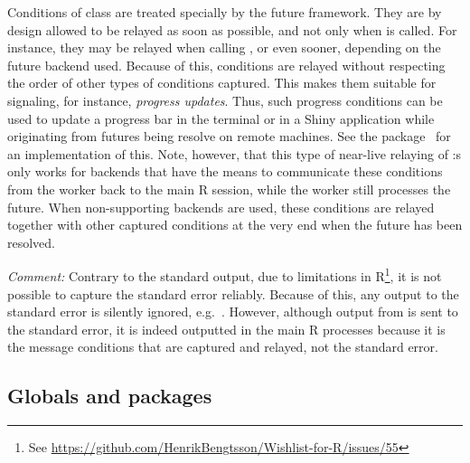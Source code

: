 Conditions of class  are treated specially by
the future framework. They are by design allowed to be relayed as soon
as possible, and not only when  is called. For instance,
they may be relayed when calling , or even sooner,
depending on the future backend used. Because of this,
 conditions are relayed without respecting
the order of other types of conditions captured. This makes them
suitable for signaling, for instance, \emph{progress updates}.  Thus,
such progress conditions can be used to update a progress bar in the
terminal or in a Shiny application while originating from futures
being resolve on remote machines.  See the 
package~\citep{CRAN:progressr} for an implementation of this.  Note,
however, that this type of near-live relaying of
:s only works for backends that have the means to
communicate these conditions from the worker back to the main R
session, while the worker still processes the future.  When
non-supporting backends are used, these conditions are relayed
together with other captured conditions at the very end when the
future has been resolved.

\emph{Comment:} Contrary to the standard output, due to limitations in
R\footnote{See \url{https://github.com/HenrikBengtsson/Wishlist-for-R/issues/55}},
it is not possible to capture the standard error reliably.  Because of
this, any output to the standard error is silently ignored,
e.g.\ . However, although
output from  is sent to the standard error, it is
indeed outputted in the main R processes because it is the message
conditions that are captured and relayed, not the standard error.


\subsection{Globals and packages}
\label{global-variables}

